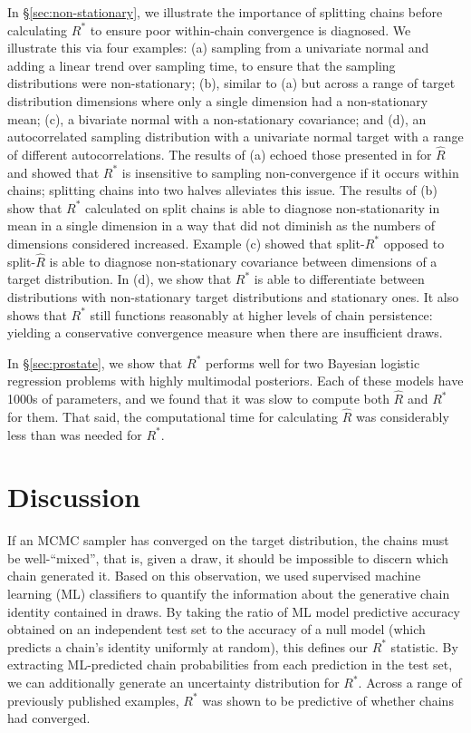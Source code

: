 \documentclass{article}
\begin{document}
In \S\ref{sec:non-stationary}, we illustrate the importance of splitting chains before calculating $R^*$ to ensure poor within-chain convergence is diagnosed. We illustrate this via four examples: (a) sampling from a univariate normal and adding a linear trend over sampling time, to ensure that the sampling distributions were non-stationary; (b), similar to (a) but across a range of target distribution dimensions where only a single dimension had a non-stationary mean; (c), a bivariate normal with a non-stationary covariance; and (d), an autocorrelated sampling distribution with a univariate normal target with a range of different autocorrelations. The results of (a) echoed those presented in \cite{vehtari2019rank} for $\widehat{R}$ and showed that $R^*$ is insensitive to sampling non-convergence if it occurs within chains; splitting chains into two halves alleviates this issue. The results of (b) show that $R^*$ calculated on split chains is able to diagnose non-stationarity in mean in a single dimension in a way that did not diminish as the numbers of dimensions considered increased. Example (c) showed that split-$R^*$ opposed to split-$\widehat{R}$ is able to diagnose non-stationary covariance between dimensions of a target distribution. In (d), we show that $R^*$ is able to differentiate between distributions with non-stationary target distributions and stationary ones. It also shows that $R^*$ still functions reasonably at higher levels of chain persistence: yielding a conservative convergence measure when there are insufficient draws.

In \S\ref{sec:prostate}, we show that $R^*$ performs well for two Bayesian logistic regression problems with highly multimodal posteriors. Each of these models have 1000s of parameters, and we found that it was slow to compute both $\widehat{R}$ and $R^*$ for them. That said, the computational time for calculating $\widehat{R}$ was considerably less than was needed for $R^*$.


\section{Discussion}
If an MCMC sampler has converged on the target distribution, the chains must be well-``mixed'', that is, given a draw, it should be impossible to discern which chain generated it. Based on this observation, we used supervised machine learning (ML) classifiers to quantify the information about the generative chain identity contained in draws. By taking the ratio of ML model predictive accuracy obtained on an independent test set to the accuracy of a null model (which predicts a chain's identity uniformly at random), this defines our $R^*$ statistic. By extracting ML-predicted chain probabilities from each prediction in the test set, we can additionally generate an uncertainty distribution for $R^*$. Across a range of previously published examples, $R^*$ was shown to be predictive of whether chains had converged.
\end{document}
